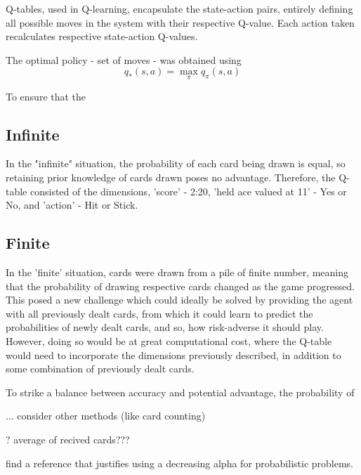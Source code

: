 \smallskip
Q-tables, used in Q-learning, encapsulate the state-action pairs, entirely defining all possible moves in the system with their respective Q-value. Each action taken recalculates respective state-action Q-values. 

\smallskip
The optimal policy - set of moves - was obtained using 
\begin{equation}
    q_*(s,a) = \max_{\pi}q_{\pi}(s,a)
\end{equation}

To ensure that the 

\subsection{Infinite}

In the "infinite" situation, the probability of each card being drawn is equal, so retaining prior knowledge of cards drawn poses no advantage. Therefore, the Q-table consisted of the dimensions, 'score' - 2:20, 'held ace valued at 11' - Yes or No, and 'action' - Hit or Stick.


\subsection{Finite}

In the 'finite' situation, cards were drawn from a pile of finite number, meaning that the probability of drawing respective cards changed as the game progressed. This posed a new challenge which could ideally be solved by providing the agent with all previously dealt cards, from which it could learn to predict the probabilities of newly dealt cards, and so, how risk-adverse it should play. However, doing so would be at great computational cost, where the Q-table would need to incorporate the dimensions previously described, in addition to some combination of previously dealt cards. 

To strike a balance between accuracy and potential advantage, the probability of 

... consider other methods (like card counting)

? average of recived cards???

find a reference that justifies using a decreasing alpha for probabilistic problems. 
